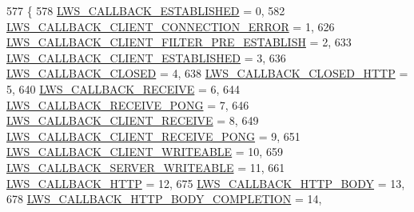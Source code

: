 \begin{DoxyCode}
577                           \{
578         \hyperlink{group__usercb_ggad62860e19975ba4c4af401c3cdb6abf7a24d39bf1cfc0bad9d92da9ac1717e439}{LWS\_CALLBACK\_ESTABLISHED}                                =  0,
582         \hyperlink{group__usercb_ggad62860e19975ba4c4af401c3cdb6abf7ad8c6207b0c4e732f3d507f0fb79370e8}{LWS\_CALLBACK\_CLIENT\_CONNECTION\_ERROR}                        =  
      1,
626         \hyperlink{group__usercb_ggad62860e19975ba4c4af401c3cdb6abf7aa536e574a642ff3ab9e12bff7ba2c6a2}{LWS\_CALLBACK\_CLIENT\_FILTER\_PRE\_ESTABLISH}                =  
      2,
633         \hyperlink{group__usercb_ggad62860e19975ba4c4af401c3cdb6abf7a7e12418eec9bce85735e6460176ab604}{LWS\_CALLBACK\_CLIENT\_ESTABLISHED}                          =  3,
636         \hyperlink{group__usercb_ggad62860e19975ba4c4af401c3cdb6abf7a48a9590e5e18c7920282e094a0bfd9d8}{LWS\_CALLBACK\_CLOSED}                                  =  4,
638         \hyperlink{group__usercb_ggad62860e19975ba4c4af401c3cdb6abf7a838b18d255c1b94a533287ba302a2eba}{LWS\_CALLBACK\_CLOSED\_HTTP}                                =  5,
640         \hyperlink{group__usercb_ggad62860e19975ba4c4af401c3cdb6abf7a492c1b1c0ac0ed980042ee732fe2990c}{LWS\_CALLBACK\_RECEIVE}                                        =  6,
644         \hyperlink{group__usercb_ggad62860e19975ba4c4af401c3cdb6abf7a2db02fc6e1c17ab62b52109d1aa9d738}{LWS\_CALLBACK\_RECEIVE\_PONG}                              =  7,
646         \hyperlink{group__usercb_ggad62860e19975ba4c4af401c3cdb6abf7abbbe7a0a67c5866ca9109d46823fc5b1}{LWS\_CALLBACK\_CLIENT\_RECEIVE}                          =  8,
649         \hyperlink{group__usercb_ggad62860e19975ba4c4af401c3cdb6abf7a136a7cec11c3afd13245623bd84e76c9}{LWS\_CALLBACK\_CLIENT\_RECEIVE\_PONG}                        =  9,
651         \hyperlink{group__usercb_ggad62860e19975ba4c4af401c3cdb6abf7a8e8b2e6dbeac76d8d126947d2166a514}{LWS\_CALLBACK\_CLIENT\_WRITEABLE}                              = 10,
659         \hyperlink{group__usercb_ggad62860e19975ba4c4af401c3cdb6abf7a7ec8e2e9557ee02a4fc9f7dec7e2babc}{LWS\_CALLBACK\_SERVER\_WRITEABLE}                              = 11,
661         \hyperlink{group__usercb_ggad62860e19975ba4c4af401c3cdb6abf7ae8d1de0bb56e03aa58cb4d44b18edd2e}{LWS\_CALLBACK\_HTTP}                                      = 12,
675         \hyperlink{group__usercb_ggad62860e19975ba4c4af401c3cdb6abf7ac4c68e00efcf1ff7bda7ada462aff8ae}{LWS\_CALLBACK\_HTTP\_BODY}                                    = 13,
678         \hyperlink{group__usercb_ggad62860e19975ba4c4af401c3cdb6abf7a2fce9a8608220f32abbf1422a5498804}{LWS\_CALLBACK\_HTTP\_BODY\_COMPLETION}                      = 14,

\end{DoxyCode}

